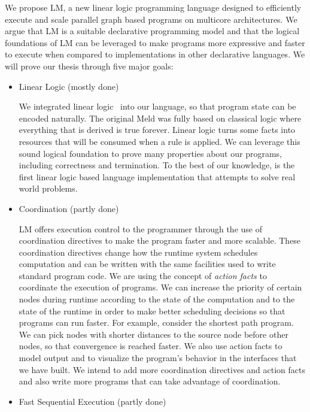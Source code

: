 
We propose LM, a new linear logic programming language designed
to efficiently execute and scale parallel graph based programs on multicore architectures.
We argue that LM is a suitable declarative programming model and that the logical foundations
of LM can be leveraged to make programs more expressive and faster to execute when compared to implementations
in other declarative languages.
We will prove our thesis through five major goals:

\begin{itemize}
   
   \item Linear Logic (mostly done)

   We integrated linear logic~\cite{Girard95logic:its} into our language, so that program state
   can be encoded naturally. The original Meld was fully based on classical logic where everything that
   is derived is true forever. Linear logic turns some facts into resources that will be consumed when a rule is applied.
   We can leverage this sound logical foundation to prove many properties about our programs, including correctness and termination.
   To the best of our knowledge, \lang is the first
   linear logic based language implementation that attempts to solve real world problems.

   \item Coordination (partly done)
   
   LM offers execution control to the programmer through the use of coordination directives to make the program
   faster and more scalable. These coordination
   directives change how the runtime system schedules computation and can be written with the same
   facilities used to write standard program code.
   We are using the concept of \emph{action facts} to coordinate the execution of programs.
   We can increase the priority of certain nodes during runtime according to the state of the
   computation and to the state of the runtime in order to make better scheduling decisions
   so that programs can run faster.
   For example, consider the shortest path program. We can pick nodes with shorter
   distances to the source node before other nodes, so that convergence is reached faster.
   We also use action facts to model output and to visualize the program's behavior in the
   interfaces that we have built. We intend to add more coordination directives and action facts
   and also write more programs that can take advantage of coordination.

   \item Fast Sequential Execution (partly done)
   

\end{itemize}
